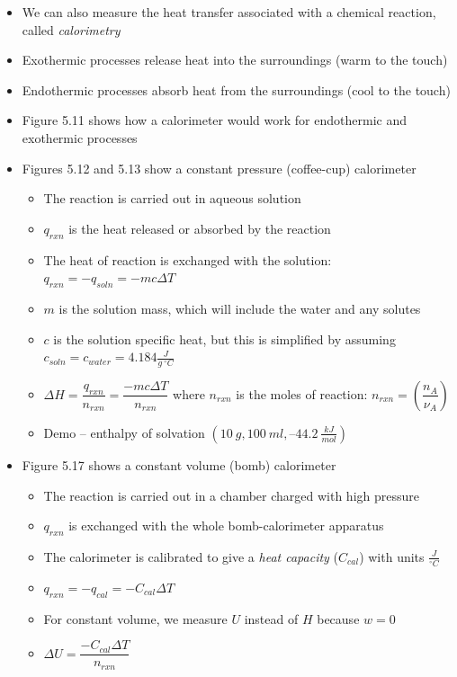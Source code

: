 \documentclass[12pt, openany, letterpaper]{memoir}
\begin{document}
\begin{itemize}
	      Practice: A $10.0~g$ block of iron is heated to $93.5~^\circ C$ and placed in $25~ml$ of $23.0~^\circ C$ water.\\
	      ~\hphantom{Practice:} What is the final temperature? ($25.9~^\circ C$)
	\item We can also measure the heat transfer associated with a chemical reaction, called \emph{calorimetry}
  \item Exothermic processes release heat into the surroundings (warm to the touch)
  \item Endothermic processes absorb heat from the surroundings (cool to the touch)
  \item Figure 5.11 shows how a calorimeter would work for endothermic and exothermic processes
  \item Figures 5.12 and 5.13 show a constant pressure (coffee-cup) calorimeter
    \begin{itemize}
      \item The reaction is carried out in aqueous solution
      \item $q_{rxn}$ is the heat released or absorbed by the reaction
      \item The heat of reaction is exchanged with the solution: $q_{rxn} = -q_{soln} = -mc\Delta T$
      \item $m$ is the solution mass, which will include the water and any solutes
      \item $c$ is the solution specific heat, but this is simplified by assuming $c_{soln}=c_{water}=4.184\frac{J}{g~^\circ C}$
      \item $\Delta H = \dfrac{q_{rxn}}{n_{rxn}} = \dfrac{-mc\Delta T}{n_{rxn}}$ where $n_{rxn}$ is the moles of reaction: $n_{rxn}=\left(\dfrac{n_A}{\nu_A}\right)$
      \item Demo --  enthalpy of solvation $\left(10~g, 100~ml, –44.2~\frac{kJ}{mol}\right)$
    \end{itemize}
  \item Figure 5.17 shows a constant volume (bomb) calorimeter
    \begin{itemize}
      \item The reaction is carried out in a chamber charged with high pressure 
      \item $q_{rxn}$ is exchanged with the whole bomb-calorimeter apparatus
      \item The calorimeter is calibrated to give a \emph{heat capacity} ($C_{cal}$) with units $\frac{J}{^\circ C}$
      \item $q_{rxn}=-q_{cal}=-C_{cal}\Delta T$
      \item For constant volume, we measure $U$ instead of $H$ because $w=0$
      \item $\Delta U = \dfrac{-C_{cal}\Delta T}{n_{rxn}}$
    \end{itemize}
\end{itemize}
\end{document}
